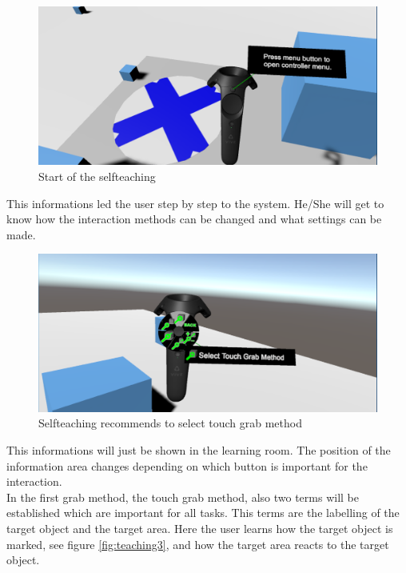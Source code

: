 \begin{figure}[H] 
	\center 
	\includegraphics[width=12cm]{Images/teaching.PNG}
	\caption[Start of the selfteaching]{Start of the selfteaching}
	\label{fig:teaching1}
\end{figure}

This informations led the user step by step to the system. He/She will get to know how the interaction methods can be changed and what settings can be made. 

\begin{figure}[H] 
	\center 
	\includegraphics[width=12cm]{Images/teaching2.PNG}
	\caption[Selfteaching recommends to select touch grab method]{Selfteaching recommends to select touch grab method}
	\label{fig:teaching2}
\end{figure}

This informations will just be shown in the learning room. The position of the information area changes depending on which button is important for the interaction. \\
In the first grab method, the touch grab method, also two terms will be established which are important for all tasks. This terms are the labelling of the target object and the target area. Here the user learns how the target object is marked, see figure \ref{fig:teaching3}, and how the target area reacts to the target object.

